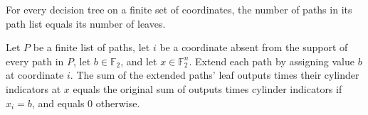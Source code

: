 \begin{theorem}
\leanok
{}
For every decision tree on a finite set of coordinates, the number of paths in its path
list equals its number of leaves.
\end{theorem}

\begin{theorem}
\leanok
{}
Let $P$ be a finite list of paths, let $i$ be a coordinate absent from the support of
every path in $P$, let $b\in\mathbb{F}_2$, and let $x\in\mathbb{F}_2^n$. Extend each
path by assigning value $b$ at coordinate $i$. The sum of the extended paths' leaf
outputs times their cylinder indicators at $x$ equals the original sum of outputs times
cylinder indicators if $x_i=b$, and equals $0$ otherwise.
\end{theorem}

